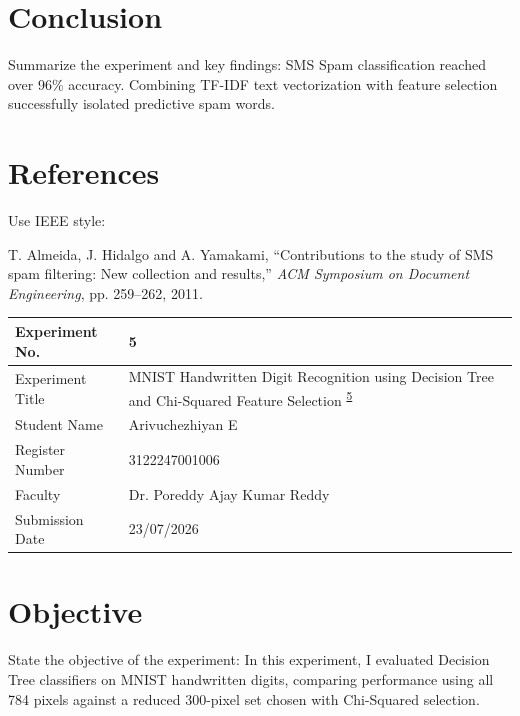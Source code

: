 \documentclass[12pt,a4paper]{article}
\begin{document}
\section{Conclusion}
Summarize the experiment and key findings:
SMS Spam classification reached over 96\% accuracy. Combining TF-IDF text vectorization with feature selection successfully isolated predictive spam words.

\section{References}
Use IEEE style:
\begin{enumerate}[label={[\arabic*]}]
\item T. Almeida, J. Hidalgo and A. Yamakami, ``Contributions to the study of SMS spam filtering: New collection and results,'' \textit{ACM Symposium on Document Engineering}, pp. 259--262, 2011.
\end{enumerate}

\newpage


\begin{tabular}{|p{4cm}|p{11cm}|}
\hline
Experiment No. & 5 \\ \hline
Experiment Title & MNIST Handwritten Digit Recognition using Decision Tree and Chi-Squared Feature Selection \textsuperscript{\href{https://github.com/arivuchezhiyan/Machine_Learning}{5}} \\ \hline
Student Name & Arivuchezhiyan E \\ \hline
Register Number & 3122247001006 \\ \hline
Faculty & Dr. Poreddy Ajay Kumar Reddy \\ \hline
Submission Date & 23/07/2026 \\ \hline
\end{tabular}

\section{Objective}
State the objective of the experiment:
In this experiment, I evaluated Decision Tree classifiers on MNIST handwritten digits, comparing performance using all 784 pixels against a reduced 300-pixel set chosen with Chi-Squared selection.
\end{document}
